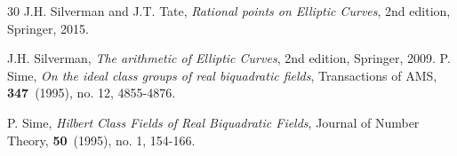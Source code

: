 \documentclass[12pt, 14paper]{amsart}
\theoremstyle{plain}
\numberwithin{equation}{section}
\begin{document}
\begin{thebibliography}{30}
    J.H. Silverman and J.T. Tate, \textit{Rational points on Elliptic Curves}, 2nd edition, Springer, 2015.

    J.H. Silverman, \textit{The arithmetic of Elliptic Curves}, 2nd edition, Springer, 2009.
    P. Sime, \textit{On the ideal class groups of real biquadratic fields}, Transactions of AMS, \textbf{347}~(1995), no. 12, 4855-4876.

   
    P. Sime, \textit{Hilbert Class Fields of Real Biquadratic Fields}, Journal of Number Theory, \textbf{50}~(1995), no. 1, 154-166.

   



   

  
  
\end{thebibliography}

   
\end{document}
